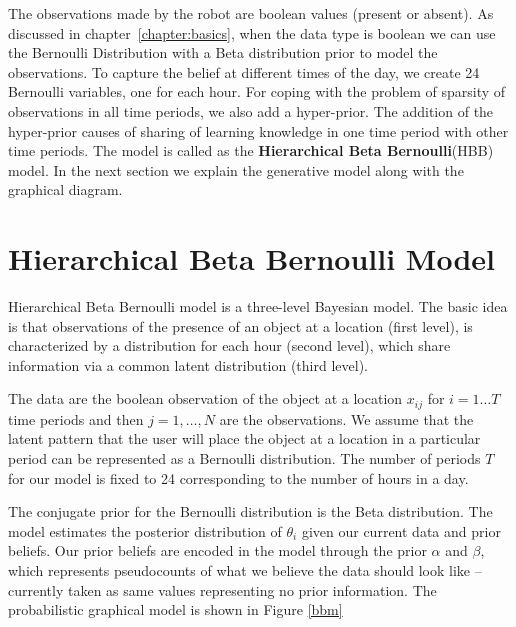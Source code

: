 The observations made by the robot are boolean values (present or absent). As discussed in chapter~\ref{chapter:basics}, when the data type is boolean we can use the Bernoulli Distribution with a Beta distribution prior to model the observations. To capture the belief at different times of the day, we create 24 Bernoulli variables, one for each hour. For coping with the problem of sparsity of observations in all time periods, we also add a hyper-prior. The addition of the hyper-prior causes of sharing of learning knowledge in one time period with other time periods. The model is called as the \textbf{Hierarchical Beta Bernoulli}(HBB)  model. In the next section we explain the generative model along with the graphical diagram. 


\section{Hierarchical Beta Bernoulli Model}

Hierarchical Beta Bernoulli model is a three-level Bayesian model. The basic idea is that observations of the presence of an object at a location (first level), is characterized by a distribution for each hour (second level), which share information via a common latent distribution (third level).

The data are the boolean observation of the object at a location $x_{ij}$ for $i = 1 \dots T$ time periods and then $j = 1, \dots , N$  are the observations.  We assume that the latent pattern that the user will place the object at a  location in a particular period can be represented as a Bernoulli distribution. The number of periods $T$ for our model is fixed to 24 corresponding to the number of hours in a day. 

The conjugate prior for the Bernoulli distribution is the Beta distribution. The model estimates the posterior distribution of $\theta_i$ given our current data and prior beliefs. Our prior beliefs are encoded in the model through the prior $\alpha$ and $\beta$, which represents pseudocounts of what we believe the data should look like – currently taken as same values representing no prior information. The probabilistic graphical model is shown in Figure \ref{bbm}

